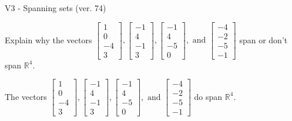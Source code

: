 \begin{exercise}
  \begin{exerciseTitle}V3 - Spanning sets (ver. 74)\end{exerciseTitle}
  \begin{exerciseStatement}
    Explain why the vectors \(\left[\begin{array}{r}
1 \\
0 \\
-4 \\
3
\end{array}\right] , \left[\begin{array}{r}
-1 \\
4 \\
-1 \\
3
\end{array}\right] , \left[\begin{array}{r}
-1 \\
4 \\
-5 \\
0
\end{array}\right] , \text{ and } \left[\begin{array}{r}
-4 \\
-2 \\
-5 \\
-1
\end{array}\right]\) span or don't span \(\mathbb{R}^4\). 
	


  \end{exerciseStatement}
  \begin{exerciseAnswer}
   The vectors \(\left[\begin{array}{r}
1 \\
0 \\
-4 \\
3
\end{array}\right] , \left[\begin{array}{r}
-1 \\
4 \\
-1 \\
3
\end{array}\right] , \left[\begin{array}{r}
-1 \\
4 \\
-5 \\
0
\end{array}\right] , \text{ and } \left[\begin{array}{r}
-4 \\
-2 \\
-5 \\
-1
\end{array}\right]\) 
  	 do  
	span \(\mathbb{R}^4\).
  


  \end{exerciseAnswer}
\end{exercise}